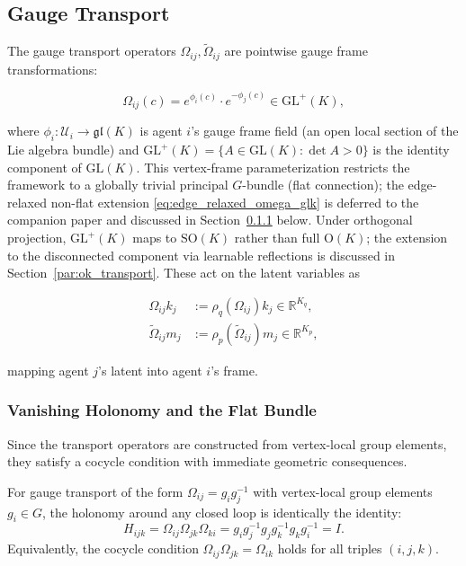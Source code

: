 \documentclass[twoside,11pt]{article}
\begin{document}
\subsection{Gauge Transport}

The gauge transport operators $\Omega_{ij}, \tilde{\Omega}_{ij}$ are pointwise gauge frame transformations:

\begin{equation}
\Omega_{ij}(c) = e^{\phi_i(c)} \cdot e^{-\phi_j(c)} \in \mathrm{GL}^+(K),
\label{eq:gauge_frame_rotation}
\end{equation}

where $\phi_i: \mathcal{U}_i \to \mathfrak{gl}(K)$ is agent $i$'s gauge frame field (an open local section of the Lie algebra bundle) and $\mathrm{GL}^+(K) = \{A \in \mathrm{GL}(K) : \det A > 0\}$ is the identity component of $\mathrm{GL}(K)$. This vertex-frame parameterization restricts the framework to a globally trivial principal $G$-bundle (flat connection); the edge-relaxed non-flat extension \eqref{eq:edge_relaxed_omega_glk} is deferred to the companion paper \citep{Dennis2025it} and discussed in Section~\ref{sec:vanishing_holonomy} below. Under orthogonal projection, $\mathrm{GL}^+(K)$ maps to $\mathrm{SO}(K)$ rather than full $\mathrm{O}(K)$; the extension to the disconnected component via learnable reflections is discussed in Section~\ref{par:ok_transport}. These act on the latent variables as

\begin{equation}
\begin{aligned}
\Omega_{ij} k_j
&:= \rho_q(\Omega_{ij}) k_j
\in \mathbb{R}^{K_q},\\
\tilde{\Omega}_{ij} m_j
&:= \rho_p(\tilde{\Omega}_{ij}) m_j
\in \mathbb{R}^{K_p},
\end{aligned}
\label{eq:gauge_action_on_vectors}
\end{equation}

mapping agent $j$'s latent into agent $i$'s frame.

\subsubsection{Vanishing Holonomy and the Flat Bundle}
\label{sec:vanishing_holonomy}

Since the transport operators are constructed from vertex-local group elements, they satisfy a cocycle condition with immediate geometric consequences.

\begin{lemma}
\label{thm:vanishing_holonomy}
For gauge transport of the form $\Omega_{ij} = g_i g_j^{-1}$ with vertex-local group elements $g_i \in G$, the holonomy around any closed loop is identically the identity:
\begin{equation}
H_{ijk} = \Omega_{ij} \Omega_{jk} \Omega_{ki}
 = g_i g_j^{-1} g_j g_k^{-1} g_k g_i^{-1}
 = I.
\label{eq:holonomy}
\end{equation}
Equivalently, the cocycle condition $\Omega_{ij} \Omega_{jk} = \Omega_{ik}$ holds for all triples $(i,j,k)$.
\end{lemma}
\end{document}
